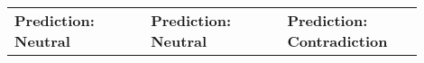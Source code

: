 \begin{table*}[t]
\begin{tabular}{@{}p{0.3\linewidth} p{0.3\linewidth} p{0.3\linewidth} @{}}
\textbf{Prediction: Neutral}                                                                                                                                                                                                                                                                                                                                                                                                                                                                                                                                                                                                                                                                                                                                                                                                                                                                                                                                                                                                                                                                                                                                                               & \textbf{Prediction: Neutral}                                                                                                                                                                                                                                                                                                                                                                                                                                                                                                                                                                                                                                                                                                                                                                                                                                                                                                                                                                                                                                                                                                                                                                                                                & {\textbf{Prediction:  \color[HTML]{FE0000}  Contradiction}}                                                                                                                                                                                                                                                                                                                                                                                                                                                                                                                                                                                                                                                                                                                                                                                                                                                                     
\end{tabular}
\end{table*}
